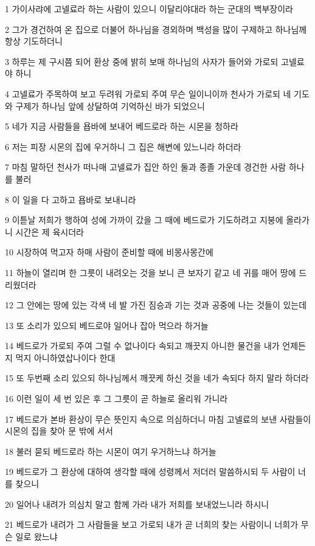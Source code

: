 \par 1 가이사랴에 고넬료라 하는 사람이 있으니 이달리야대라 하는 군대의 백부장이라
\par 2 그가 경건하여 온 집으로 더불어 하나님을 경외하며 백성을 많이 구제하고 하나님께 항상 기도하더니
\par 3 하루는 제 구시쯤 되어 환상 중에 밝히 보매 하나님의 사자가 들어와 가로되 고넬료야 하니
\par 4 고넬료가 주목하여 보고 두려워 가로되 주여 무슨 일이니이까 천사가 가로되 네 기도와 구제가 하나님 앞에 상달하여 기억하신 바가 되었으니
\par 5 네가 지금 사람들을 욥바에 보내어 베드로라 하는 시몬을 청하라
\par 6 저는 피장 시몬의 집에 우거하니 그 집은 해변에 있느니라 하더라
\par 7 마침 말하던 천사가 떠나매 고넬료가 집안 하인 둘과 종졸 가운데 경건한 사람 하나를 불러
\par 8 이 일을 다 고하고 욥바로 보내니라
\par 9 이튿날 저희가 행하여 성에 가까이 갔을 그 때에 베드로가 기도하려고 지붕에 올라가니 시간은 제 육시더라
\par 10 시장하여 먹고자 하매 사람이 준비할 때에 비몽사몽간에
\par 11 하늘이 열리며 한 그릇이 내려오는 것을 보니 큰 보자기 같고 네 귀를 매어 땅에 드리웠더라
\par 12 그 안에는 땅에 있는 각색 네 발 가진 짐승과 기는 것과 공중에 나는 것들이 있는데
\par 13 또 소리가 있으되 베드로야 일어나 잡아 먹으라 하거늘
\par 14 베드로가 가로되 주여 그럴 수 없나이다 속되고 깨끗지 아니한 물건을 내가 언제든지 먹지 아니하였삽나이다 한대
\par 15 또 두번째 소리 있으되 하나님께서 깨끗케 하신 것을 네가 속되다 하지 말라 하더라
\par 16 이런 일이 세 번 있은 후 그 그릇이 곧 하늘로 올리워 가니라
\par 17 베드로가 본바 환상이 무슨 뜻인지 속으로 의심하더니 마침 고넬료의 보낸 사람들이 시몬의 집을 찾아 문 밖에 서서
\par 18 불러 묻되 베드로라 하는 시몬이 여기 우거하느냐 하거늘
\par 19 베드로가 그 환상에 대하여 생각할 때에 성령께서 저더러 말씀하시되 두 사람이 너를 찾으니
\par 20 일어나 내려가 의심치 말고 함께 가라 내가 저희를 보내었느니라 하시니
\par 21 베드로가 내려가 그 사람들을 보고 가로되 내가 곧 너희의 찾는 사람이니 너희가 무슨 일로 왔느냐
